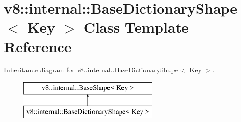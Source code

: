 \hypertarget{classv8_1_1internal_1_1_base_dictionary_shape}{}\section{v8\+:\+:internal\+:\+:Base\+Dictionary\+Shape$<$ Key $>$ Class Template Reference}
\label{classv8_1_1internal_1_1_base_dictionary_shape}
Inheritance diagram for v8\+:\+:internal\+:\+:Base\+Dictionary\+Shape$<$ Key $>$\+:\begin{figure}[H]
\begin{center}
\leavevmode
\includegraphics[height=2.000000cm]{classv8_1_1internal_1_1_base_dictionary_shape}
\end{center}
\end{figure}
